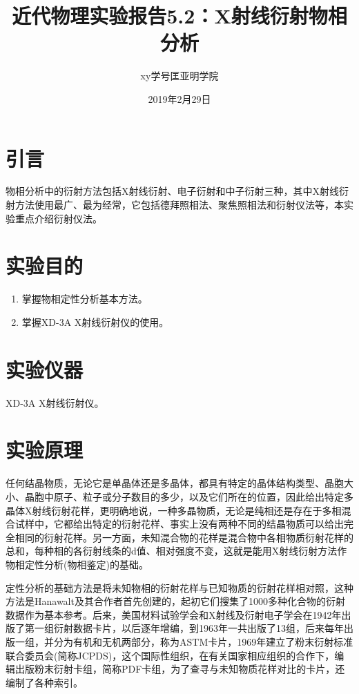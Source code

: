 \documentclass[a4paper]{article}
\title{近代物理实验报告5.2：X射线衍射物相分析}
\author{xy\quad 学号\quad 匡亚明学院}
\date{2019年2月29日}
\begin{document}
\sloppy
\maketitle


\section{引言}
物相分析中的衍射方法包括X射线衍射、电子衍射和中子衍射三种，其中X射线衍射方法使用最广、最为经常，它包括德拜照相法、聚焦照相法和衍射仪法等，本实验重点介绍衍射仪法。

\section{实验目的}
\begin{enumerate}
\item 掌握物相定性分析基本方法。
\item 掌握XD-3A X射线衍射仪的使用。
\end{enumerate}

\section{实验仪器}
XD-3A X射线衍射仪。

\section{实验原理}
任何结晶物质，无论它是单晶体还是多晶体，都具有特定的晶体结构类型、晶胞大小、晶胞中原子、粒子或分子数目的多少，以及它们所在的位置，因此给出特定多晶体X射线衍射花样，更明确地说，一种多晶物质，无论是纯相还是存在于多相混合试样中，它都给出特定的衍射花样、事实上没有两种不同的结晶物质可以给出完全相同的衍射花样。另一方面，未知混合物的花样是混合物中各相物质衍射花样的总和，每种相的各衍射线条的d值、相对强度不变，这就是能用X射线衍射方法作物相定性分析(物相鉴定)的基础。

定性分析的基础方法是将未知物相的衍射花样与已知物质的衍射花样相对照，这种方法是Hanawalt及其合作者首先创建的，起初它们搜集了1000多种化合物的衍射数据作为基本参考。后来，美国材料试验学会和X射线及衍射电子学会在1942年出版了第一组衍射数据卡片，以后逐年增编，到1963年一共出版了13组，后来每年出版一组，并分为有机和无机两部分，称为ASTM卡片，1969年建立了粉末衍射标准联合委员会(简称JCPDS)，这个国际性组织，在有关国家相应组织的合作下，编辑出版粉末衍射卡组，简称PDF卡组，为了查寻与未知物质花样对比的卡片，还编制了各种索引。
\end{document}
